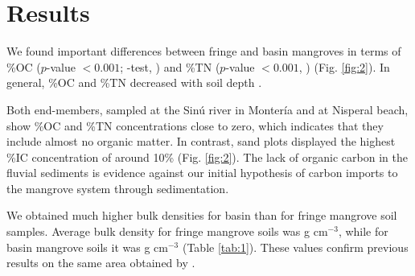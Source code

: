 \DIFaddend %
\section{Results}

We found important differences between fringe and basin mangroves in terms of \%OC ($p$-value $< 0.001$; \DIFdelbegin {}\DIFdelend \DIFaddbegin {}\DIFaddend -test, \DIFdelbegin {}\DIFdelend \DIFaddbegin {}\DIFaddend ) and \%TN ($p$-value $< 0.001$, \DIFdelbegin {}\DIFdelend \DIFaddbegin {}\DIFaddend ) (Fig. \ref{fig:2}). In general, \%OC and \%TN decreased with soil depth \DIFdelbegin {}\DIFdelend \DIFaddbegin {}\DIFaddend .  

Both end-members, sampled at the Sin\'{u} river in Monter\'{i}a and at Nisperal beach, show \%OC and \%TN concentrations close to zero, which indicates that they include almost no organic matter. In contrast, sand plots displayed the highest \%IC concentration of around 10\% (Fig. \ref{fig:2}). The lack of organic carbon in the fluvial sediments is evidence against our initial hypothesis of carbon imports to the mangrove system through sedimentation. 

We obtained much higher bulk densities for basin than for fringe mangrove soil samples. Average \DIFaddbegin {}\DIFaddend bulk density for fringe mangrove soils was \DIFdelbegin {}\DIFdelend \DIFaddbegin {}\DIFaddend g cm$^{-3}$, while for basin mangrove soils it was \DIFdelbegin {}\DIFdelend \DIFaddbegin {}\DIFaddend g cm$^{-3}$ (Table \ref{tab:1}). These values confirm previous results on the same area obtained by \citet{Bolivar2015}.

